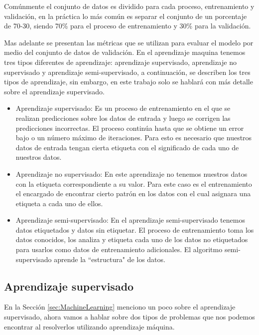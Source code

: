 Comúnmente el conjunto de datos es dividido para cada proceso, entrenamiento y validación, en la práctica lo más común es separar el conjunto de un porcentaje de 70-30, siendo 70\% para el proceso de entrenamiento y 30\% para la validación.

Mas adelante se presentan las métricas que se utilizan para evaluar el modelo por medio del conjunto de datos de validación. En el aprendizaje maquina tenemos tres tipos diferentes de aprendizaje: aprendizaje supervisado, aprendizaje no supervisado y aprendizaje semi-supervisado, a continuación, se describen los tres tipos de aprendizaje, sin embargo, en este trabajo solo se hablará con más detalle sobre el aprendizaje supervisado.

\begin{itemize}

    \item Aprendizaje supervisado: Es un proceso de entrenamiento en el que se realizan predicciones sobre los datos de entrada y luego se corrigen las predicciones incorrectas. El proceso continúa hasta que se obtiene un error bajo o un número máximo de iteraciones. Para esto es necesario que nuestros datos de entrada tengan cierta etiqueta con el significado de cada uno de nuestros datos.

    \item Aprendizaje no supervisado: En este aprendizaje no tenemos nuestros datos con la etiqueta correspondiente a su valor. Para este caso es el entrenamiento el encargado de encontrar cierto patrón en los datos con el cual asignara una etiqueta a cada uno de ellos.

    \item Aprendizaje semi-supervisado: En el aprendizaje semi-supervisado tenemos datos etiquetados y datos sin etiquetar. El proceso de entrenamiento toma los datos conocidos, los analiza y etiqueta cada uno de los datos no etiquetados para usarlos como datos de entrenamiento adicionales. El algoritmo semi-supervisado aprende la “estructura" de los datos.

\end{itemize}


\subsection{Aprendizaje supervisado}

En la Sección \ref{sec:MachineLearning} menciono un poco sobre el aprendizaje supervisado, ahora vamos a hablar sobre dos tipos de problemas que nos podemos encontrar al resolverlos utilizando aprendizaje máquina.

